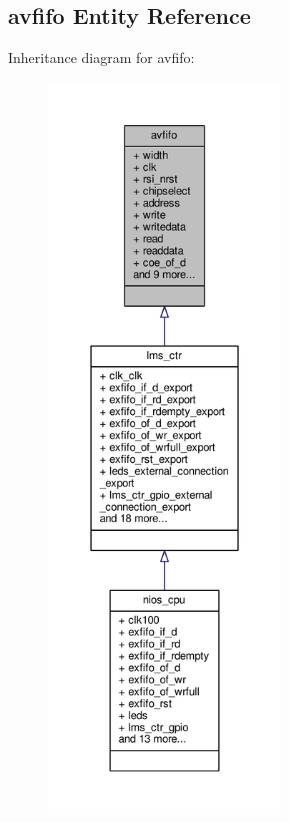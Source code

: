 \subsection{avfifo Entity Reference}
\label{classavfifo}


Inheritance diagram for avfifo\+:\nopagebreak
\begin{figure}[H]
\begin{center}
\leavevmode
\includegraphics[height=550pt]{d1/d67/classavfifo__inherit__graph}
\end{center}
\end{figure}


